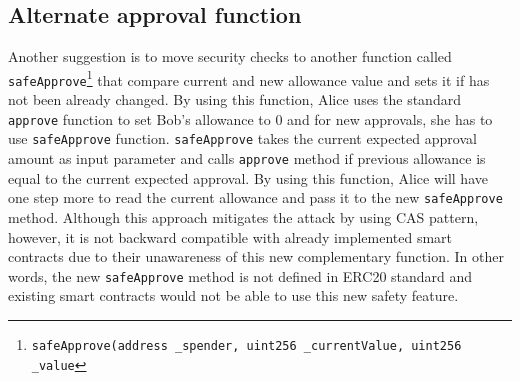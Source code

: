 \subsection{Alternate approval function}
Another suggestion\cite{Ref16} is to move security checks to another function called \texttt{safeApprove}\footnote{\texttt{safeApprove(address \_spender, uint256 \_currentValue, uint256 \_value}} that compare current and new allowance value and sets it if has not been already changed. By using this function, Alice uses the standard \texttt{approve} function to set Bob’s allowance to 0 and for new approvals, she has to use \texttt{safeApprove} function. \texttt{safeApprove} takes the current expected approval amount as input parameter and calls \texttt{approve} method if previous allowance is equal to the current expected approval. By using this function, Alice will have one step more to read the current allowance and pass it to the new \texttt{safeApprove} method. Although this approach mitigates the attack by using CAS pattern\cite{Ref06}, however, it is not backward compatible with already implemented smart contracts due to their unawareness of this new complementary function. In other words, the new \texttt{safeApprove} method is not defined in ERC20 standard and existing smart contracts would not be able to use this new safety feature.

